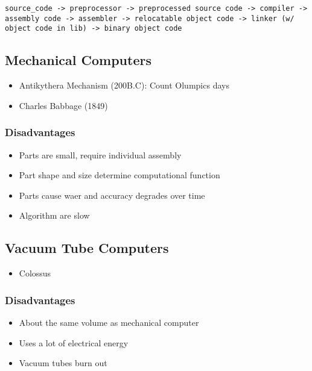 \documentclass[11pt]{article}
\begin{document}
\begin{verbatim}
source_code -> preprocessor -> preprocessed source code -> compiler -> assembly code -> assembler -> relocatable object code -> linker (w/ object code in lib) -> binary object code
\end{verbatim}

\subsection{Mechanical Computers}
\label{sec:org6b758f2}

\begin{itemize}
\item Antikythera Mechanism (200B.C): Count Olumpics days
\item Charles Babbage (1849)
\end{itemize}

\subsubsection{Disadvantages}
\label{sec:orgc05276f}

\begin{itemize}
\item Parts are small, require individual assembly
\item Part shape and size determine computational function
\item Parts cause waer and accuracy degrades over time
\item Algorithm are slow
\end{itemize}

\subsection{Vacuum Tube Computers}
\label{sec:orgc1906c1}

\begin{itemize}
\item Colossus
\end{itemize}

\subsubsection{Disadvantages}
\label{sec:orgf857a19}

\begin{itemize}
\item About the same volume as mechanical computer
\item Uses a lot of electrical energy
\item Vacuum tubes burn out
\end{itemize}
\end{document}
